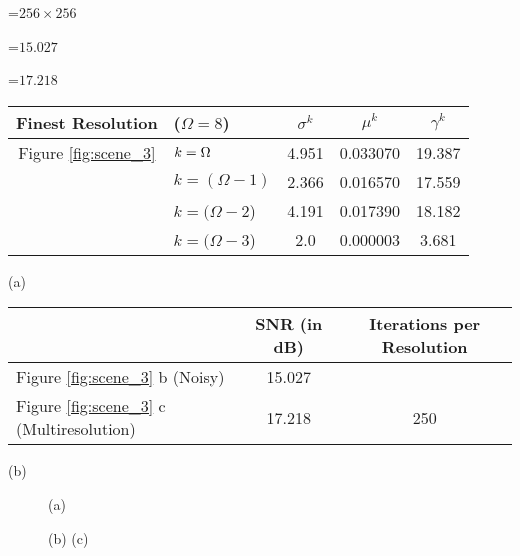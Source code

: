 {\newpage
\clearpage
\samepage \setbox\sizebox=\hbox{$256
\times 256$}\box\sizebox
}

{\newpage
\clearpage
\samepage \setbox\sizebox=\hbox{$15.027$}\box\sizebox
}

{\newpage
\clearpage
\samepage \setbox\sizebox=\hbox{$17.218$}\box\sizebox
}

{\newpage
\clearpage
\samepage \begin{table}%
\begin{center}
 
\begin{tabular}{||cl||c|c|c||} \hline \hline
Finest Resolution &($\Omega=8$)& $\sigma^k$ & $\mu^k$  & $\gamma^k$ \\  
\hline \hline
 Figure \ref{fig:scene_3}        &$k=\Omega$ &4.951  &0.033070&19.387 \\ 
             & $k=(\Omega
 -1)$  &2.366 &0.016570&17.559  \\ 
             &$k=(\Omega
 -2$) &4.191  &0.017390&18.182 \\ 
             &$k=(\Omega
 -3$) &2.0  &0.000003& 3.681\\  \hline \hline
\end{tabular}
\centerline{(a)} 

\vspace{1ex}

 \begin{tabular}{||l||c|c||} \hline  \hline 
& SNR (in dB)& Iterations per Resolution \\  \hline \hline
 Figure \ref{fig:scene_3}  b (Noisy) &  15.027 &      \\  \hline
 Figure \ref{fig:scene_3}  c (Multiresolution)& 17.218   & 250  \\  \hline \hline
 \end{tabular}
 \centerline{(b)}
 
 \label{tab:scene_3}
 \end{center}
 
 \end{table}
}

{\newpage
\clearpage
\samepage \begin{figure}\centerline{ \hfill
{} \hfill} 
\centerline{ \hfill (a) \hfill} \vspace{2ex}
\centerline{ \hfill
{} \hfill
{} \hfill
}
\centerline{\hfill (b) \hfill (c) \hfill}

\label{fig:scene_4}
\end{figure}
}

